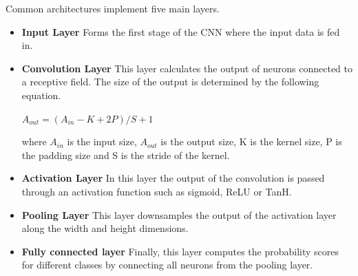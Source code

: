 Common architectures implement five main layers. 
\begin{itemize}[noitemsep]
	\item  \textbf{Input Layer} Forms the first stage of the CNN where the input data is fed in.
	\item  \textbf{Convolution Layer} This layer calculates the output of neurons connected to a receptive field.
	The size of the output is determined by the following equation. 
	
	$A_{out}= (A_{in}-K+2P)/S+1$
	
	where $A_{in}$ is the input size,  $A_{out}$ is the output size, K is the kernel size, P is the padding size and S is the stride of the kernel. 
	\item  \textbf{Activation Layer} In this layer the output of the convolution is passed through an activation function such as sigmoid, ReLU or TanH. 
	\item  \textbf{Pooling Layer} This layer downsamples the  output of the activation layer along the width and height dimensions. 
	\item \textbf{Fully connected layer} Finally, this layer computes the probability scores for different classes by connecting all neurons from the pooling layer. 
\end{itemize}

